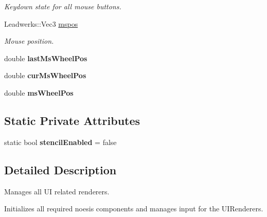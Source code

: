 \begin{DoxyCompactItemize}
\begin{DoxyCompactList}\small\item\em Keydown state for all mouse buttons. \end{DoxyCompactList}\item 
\hypertarget{class_u_i_system_a43e14bcc1d98c5e8651cde6e194206d7}{Leadwerks\-::\-Vec3 \hyperlink{class_u_i_system_a43e14bcc1d98c5e8651cde6e194206d7}{mspos}}\label{class_u_i_system_a43e14bcc1d98c5e8651cde6e194206d7}

\begin{DoxyCompactList}\small\item\em Mouse position. \end{DoxyCompactList}\item 
\hypertarget{class_u_i_system_a7772c89c41305eddb51133916908a33d}{double {\bfseries last\-Ms\-Wheel\-Pos}}\label{class_u_i_system_a7772c89c41305eddb51133916908a33d}

\item 
\hypertarget{class_u_i_system_a73ad35f216be30560290a1870caf9c67}{double {\bfseries cur\-Ms\-Wheel\-Pos}}\label{class_u_i_system_a73ad35f216be30560290a1870caf9c67}

\item 
\hypertarget{class_u_i_system_aaf09f639ae523ee3d7ba186951518ec8}{double {\bfseries ms\-Wheel\-Pos}}\label{class_u_i_system_aaf09f639ae523ee3d7ba186951518ec8}

\end{DoxyCompactItemize}
\subsection*{Static Private Attributes}
\begin{DoxyCompactItemize}
\item 
\hypertarget{class_u_i_system_aafd55f203f9f504076c5e6cdcc5d3062}{static bool {\bfseries stencil\-Enabled} = false}\label{class_u_i_system_aafd55f203f9f504076c5e6cdcc5d3062}

\end{DoxyCompactItemize}


\subsection{Detailed Description}
Manages all U\-I related renderers. 

Initializes all required noesis components and manages input for the U\-I\-Renderers. 

